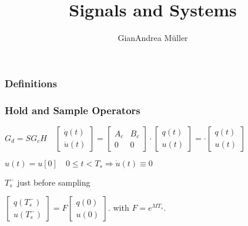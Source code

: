 \documentclass[7pt,a4paper]{scrartcl}
\begin{document}
\title{Signals and Systems}

\author{GianAndrea Müller}

\begin{multicols*}{4}

\subsubsection*{Definitions}


\subsubsection*{Hold and Sample Operators}


\begin{center}
$G_d=SG_cH\quad\begin{bmatrix}\dot{q}(t)\\\dot{u}(t)\end{bmatrix}=\begin{bmatrix}A_c&B_c\\0&0\end{bmatrix}\cdot\begin{bmatrix}q(t)\\u(t)\end{bmatrix}=$$\cdot\begin{bmatrix}q(t)\\u(t)\end{bmatrix}$
\end{center}

$u(t)=u[0]\quad 0\leq t<T_s\Rightarrow\dot{u}(t)\equiv0$ 

$T_s^-$ just before sampling

\begin{center}
$\begin{bmatrix}q(T_s^-)\\u(T_s^-)\end{bmatrix}=F\begin{bmatrix}q(0)\\u(0)\end{bmatrix}$. with $F=e^{MT_s}$.

\end{center}



\end{multicols*}
\end{document}
